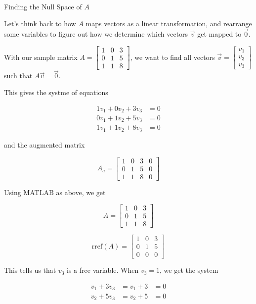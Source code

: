 \documentclass{ximera}
\begin{document}
\begin{exploration}{Finding the Null Space of $A$}

Let's think back to how $A$ maps vectors as a linear transformation, and rearrange some variables to figure out how we determine which vectors $\vec{v}$ get mapped to $\vec{0}$. 

With our sample matrix $A=\begin{bmatrix} 1 & 0 & 3 \\ 0 & 1 & 5 \\ 1 & 1 & 8 \end{bmatrix}$, we want to find all vectors $\vec{v} = \begin{bmatrix} v_1 \\ v_3 \\ v_3 \end{bmatrix}$ such that $A\vec{v} = \vec{0}$.

This gives the systme of equations

\[
\begin{aligned}
    1v_1 + 0v_2 + 3v_3 &= 0 \\
    0v_1 + 1v_2 + 5v_3 &= 0 \\
    1v_1 + 1v_2 + 8v_3 &= 0
\end{aligned}
\]

and the augmented matrix

\[A_a=\left[\begin{array}{ccc|c}1&0&3&0\\
    0&1&5&0\\
    1&1&8&0
\end{array}\right]\]

Using MATLAB as above, we get

$$A=\begin{bmatrix} 1 & 0 & 3 \\ 0 & 1 & 5 \\ 1 & 1 & 8 \end{bmatrix}$$

$$\text{rref}(A)=\begin{bmatrix} 1 & 0 & 3 \\ 0 & 1 & 5 \\ 0 & 0 & 0 \end{bmatrix}$$

This tells us that $v_3$ is a free variable. When $v_3=1$, we get the system 

\[
\begin{aligned}
    v_1 + 3v_3 &= v_1+3&=0 \\
    v_2 + 5v_3 &= v_2+5&=0
\end{aligned}
\]


\end{exploration}
\end{document}
